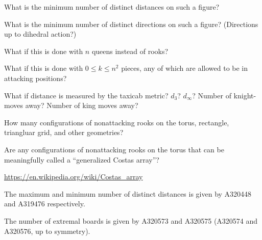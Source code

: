 \documentclass{article}
\begin{document}
\begin{question}
  What is the minimum number of distinct distances on such a figure?
\end{question}
\begin{related}
  \item What is the minimum number of distinct directions on such a figure?
    (Directions up to dihedral action?)
  \item What if this is done with $n$ queens instead of rooks?
  \item What if this is done with $0 \leq k \leq n^2$ pieces, any of which are allowed
    to be in attacking positions?
  \item What if distance is measured by the taxicab metric? $d_3$? $d_\infty$?
  Number of knight-moves away? Number of king moves away?
  \item How many configurations of nonattacking rooks on the torus, rectangle,
  triangluar grid, and other geometries?
  \item Are any configurations of nonattacking rooks on the torus that can
    be meaningfully called a ``generalized Costas array''?
\end{related}
\begin{references}
  \item \url{https://en.wikipedia.org/wiki/Costas_array}
  \item The maximum and minimum number of distinct distances is given by
  A320448 and A319476 respectively.
  \item The number of extremal boards is given by
  A320573 and A320575 (A320574 and A320576, up to symmetry).
\end{references}
\end{document}
